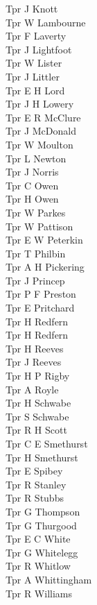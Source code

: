 \begin{multicols}{2}
  Tpr J Knott \\
  Tpr W Lambourne \\
  Tpr F Laverty \\
  Tpr J Lightfoot \\
  Tpr W Lister \\
  Tpr J Littler \\
  Tpr E H Lord \\
  Tpr J H Lowery \\
  Tpr E R McClure \\
  Tpr J McDonald \\
  Tpr W Moulton \\
  Tpr L Newton \\
  Tpr J Norris \\
  Tpr C Owen \\
  Tpr H Owen \\
  Tpr W Parkes \\
  Tpr W Pattison \\
  Tpr E W Peterkin \\
  Tpr T Philbin \\
  Tpr A H Pickering \\
  Tpr J Princep \\
  Tpr P F Preston \\
  Tpr E Pritchard \\
  Tpr H Redfern \\
  Tpr H Redfern \\
  Tpr H Reeves \\
  Tpr J Reeves \\
  Tpr H P Rigby \\
  Tpr A Royle \\
  Tpr H Schwabe \\
  Tpr S Schwabe \\
  Tpr R H Scott \\
  Tpr C E Smethurst \\
  Tpr H Smethurst \\
  Tpr E Spibey \\
  Tpr R Stanley \\
  Tpr R Stubbs \\
  Tpr G Thompson \\
  Tpr G Thurgood \\
  Tpr E C White \\
  Tpr G Whitelegg \\
  Tpr R Whitlow \\
  Tpr A Whittingham \\
  Tpr R Williams \\

\end{multicols}
